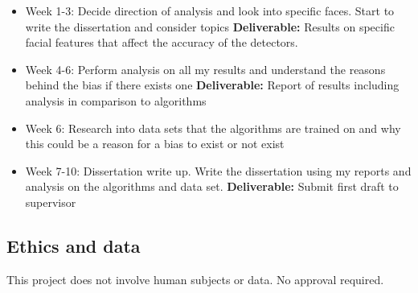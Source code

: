 \documentclass[11pt]{article}
\begin{document}
\begin{itemize}
    \item
      Week 1-3: Decide direction of analysis and look into specific faces. Start to write the dissertation and consider topics \textbf{Deliverable:}
      Results on specific facial features that affect the accuracy of the detectors.
    \item
      Week 4-6: Perform analysis on all my results and understand the reasons behind the bias if there exists one \textbf{Deliverable:} Report of results including analysis in comparison to algorithms
    \item 
      Week 6: Research into data sets that the algorithms are trained on and why this could be a reason for a bias to exist or not exist
    \item
      Week 7-10: Dissertation write up. Write the dissertation using my reports and analysis on the algorithms and data set. \textbf{Deliverable:} Submit first draft to supervisor
    \end{itemize}

    
\subsection{Ethics and data}\label{ethics}
This project does not involve human subjects or data. No approval required.
  
\end{document}
